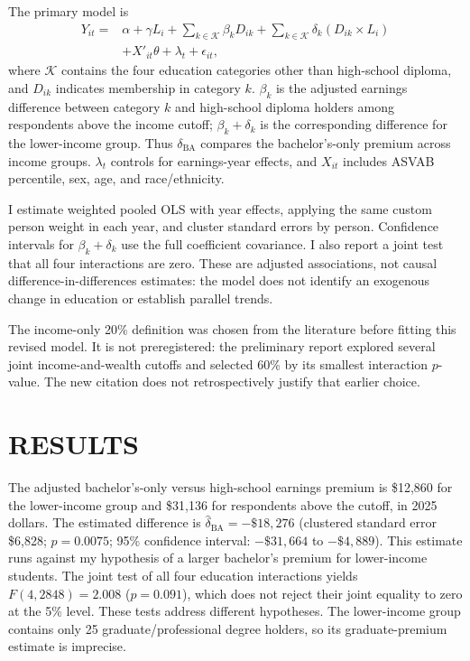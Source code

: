 \documentclass[12pt,letterpaper]{article}
\begin{document}
The primary model is
\[
\begin{aligned}
    Y_{it}={}&\alpha+\gamma L_i+\sum_{k\in\mathcal K}\beta_k D_{ik}
              +\sum_{k\in\mathcal K}\delta_k(D_{ik}\times L_i)\\
             &+X'_{it}\theta+\lambda_t+\epsilon_{it},
\end{aligned}
\]
where $\mathcal K$ contains the four education categories other than high-school
diploma, and $D_{ik}$ indicates membership in category $k$. $\beta_k$ is the adjusted
earnings difference between category $k$ and high-school diploma holders among
respondents above the income cutoff; $\beta_k+\delta_k$ is the corresponding
difference for the lower-income group. Thus $\delta_{\mathrm{BA}}$ compares the
bachelor's-only premium across income groups. $\lambda_t$ controls for earnings-year
effects, and $X_{it}$ includes ASVAB percentile, sex, age, and race/ethnicity.

I estimate weighted pooled OLS with year effects, applying the same custom person
weight in each year, and cluster standard errors by person. Confidence intervals
for $\beta_k+\delta_k$ use the full coefficient covariance. I also report a joint
test that all four interactions are zero. These are adjusted associations, not
causal difference-in-differences estimates: the model does not identify an
exogenous change in education or establish parallel trends.

The income-only 20\% definition was chosen from the literature before fitting this
revised model. It is not preregistered: the preliminary report explored several
joint income-and-wealth cutoffs and selected 60\% by its smallest interaction
$p$-value. The new citation does not retrospectively justify that earlier choice.

\section*{RESULTS}
The adjusted bachelor's-only versus high-school earnings premium is \$12,860 for
the lower-income group and \$31,136 for respondents above the cutoff, in 2025 dollars.
The estimated difference is $\hat\delta_{\mathrm{BA}}=-\$18,276$
(clustered standard error \$6,828; $p=0.0075$; 95\% confidence interval:
$-\$31,664$ to $-\$4,889$). This estimate runs against my hypothesis of a larger
bachelor's premium for lower-income students. The joint test of all four education
interactions yields $F(4,2848)=2.008$ ($p=0.091$), which does not reject their joint
equality to zero at the 5\% level. These tests address different hypotheses.
The lower-income group contains only 25 graduate/professional degree holders,
so its graduate-premium estimate is imprecise.
\end{document}
